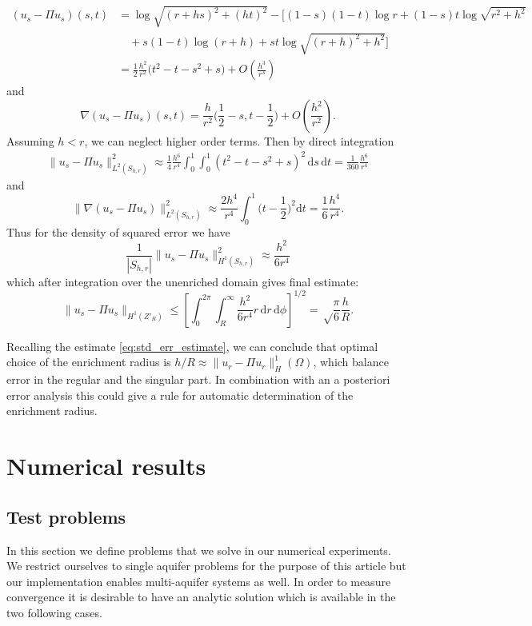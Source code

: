 \documentclass[preprint,12pt]{elsarticle}
\def\abs#1{\left|#1\right|}
\def\d{\mathrm{d}}
\def\norm#1{\| #1 \|}
\def\abs#1{| #1 |}
\begin{document}
\begin{align*}
 (u_s - \Pi u_s)(s,t)&=\log\sqrt{(r+hs)^2+(ht)^2} -\Big[(1-s)(1-t)\log r + (1-s)t\log\sqrt{r^2+h^2}\\
 &\quad+ s(1-t) \log(r+h) + st\log\sqrt{(r+h)^2+h^2} \Big]\\
 &=\frac12 \frac{h^2}{r^2}\big(t^2-t - s^2 +s\big) + O(\frac{h^3}{r^3})
\end{align*}
and 
\begin{equation}
 \nabla(u_s - \Pi u_s)(s,t) = \frac{h}{r^2} \Big( \frac12-s, t-\frac12 \Big) + O(\frac{h^2}{r^2}).
\end{equation}
Assuming $h<r$, we can neglect higher order terms. Then by direct integration
\begin{align*}
 \norm{u_s - \Pi u_s}^2_{L^2(S_{h,r})} \approx \frac14 \frac{h^6}{r^4}\int_0^1\int_0^1 (t^2-t-s^2+s)^2\,\d s\, \d t = \frac{1}{360}\frac{h^6}{r^4} 
\end{align*}
and
\begin{equation}
    \label{eq:grad_estimate_on_square}
    \norm{\nabla(u_s - \Pi u_s)}^2_{L^2(S_{h,r})} \approx \frac{2h^4}{r^4} \int_0^1 \Big(t-\frac12\Big)^2 \d t = \frac{1}{6}\frac{h^4}{r^4}.
\end{equation}
Thus for the density of squared error we have
\[
    \frac{1}{\abs{S_{h,r}}} \norm{u_s - \Pi u_s}^2_{H^1(S_{h,r})} \approx \frac{h^2}{6r^4}
\]
which after integration over the unenriched domain gives final estimate:
\begin{equation}
    \label{eq:singular_approx_error}
    \norm{u_s - \Pi u_s}_{H^1(Z'_R)} \le \left[\int_0^{2\pi} \int_R^\infty \frac{h^2} {6r^4} r \,\d r\, \d \phi\right]^{1/2} = \sqrt\frac{\pi}{6}\frac{h}{R}. 
\end{equation}

Recalling the estimate \eqref{eq:std_err_estimate}, we can conclude that optimal choice of the enrichment radius is $h/R\approx \norm{u_r-\Pi u_r}_H^1(\Omega)$, 
which balance error in the regular and the singular part. In combination with an a posteriori error analysis this could give a rule for automatic
determination of the enrichment radius.



\section{Numerical results}
\label{sec:results}

\subsection{Test problems} \label{sec:test_cases}
In this section we define problems that we solve in our numerical experiments. We restrict ourselves to 
single aquifer problems for the purpose of this article but our implementation enables multi-aquifer systems 
as well. In order to measure convergence it is desirable to have an analytic solution which is available
in the two following cases. 
\end{document}
